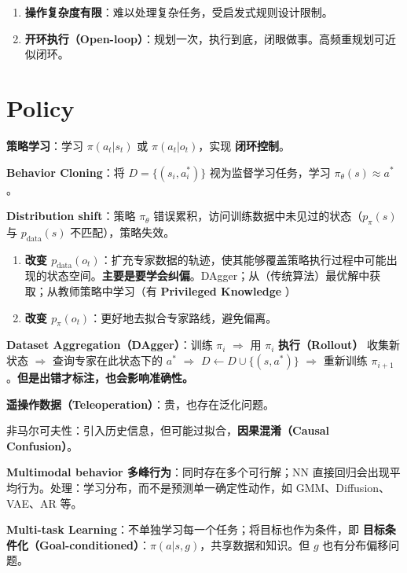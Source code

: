 \documentclass[
  8pt]{extarticle}
\providecommand{\tightlist}{%
  \setlength{\itemsep}{0pt}\setlength{\parskip}{0pt}}
\begin{document}
\begin{multicols*}{4}
\begin{enumerate}
\def\labelenumi{\arabic{enumi}.}
\tightlist
\item
  \textbf{操作复杂度有限}：难以处理复杂任务，受启发式规则设计限制。
\item
  \textbf{开环执行（Open-loop）}：规划一次，执行到底，闭眼做事。高频重规划可近似闭环。
\end{enumerate}

\hypertarget{policy}{%
\section{Policy}\label{policy}}

\textbf{策略学习}：学习 \(\pi(a_t|s_t)\) 或 \(\pi(a_t|o_t)\)，实现
\textbf{闭环控制}。

\textbf{Behavior Cloning}：将 \(D = \{(s_i, a_i^*)\}\)
视为监督学习任务，学习 \(\pi_\theta(s) \approx a^*\)。

\textbf{Distribution shift}：策略 \(\pi_\theta\)
错误累积，访问训练数据中未见过的状态（\(p_\pi(s)\) 与
\(p_{\text{data}}(s)\) 不匹配），策略失效。

\begin{enumerate}
\def\labelenumi{\arabic{enumi}.}
\tightlist
\item
  \textbf{改变
  \(p_{\text{data}}(o_t)\)}：扩充专家数据的轨迹，使其能够覆盖策略执行过程中可能出现的状态空间。\textbf{主要是要学会纠偏}。DAgger；从（传统算法）最优解中获取；从教师策略中学习（有
  \textbf{Privileged Knowledge} ）
\item
  \textbf{改变 \(p_{\pi}(o_t)\)}：更好地去拟合专家路线，避免偏离。
\end{enumerate}

\textbf{Dataset Aggregation（DAgger）}：训练 \(\pi_i\) \(\Rightarrow\)
用 \(\pi_i\) \textbf{执行（Rollout）} 收集新状态 \(\Rightarrow\)
查询专家在此状态下的 \(a^*\) \(\Rightarrow\)
\(D \leftarrow D \cup \{(s, a^*)\}\) \(\Rightarrow\) 重新训练
\(\pi_{i+1}\)。\textbf{但是出错才标注，也会影响准确性。}

\textbf{遥操作数据（Teleoperation）}：贵，也存在泛化问题。

非马尔可夫性：引入历史信息，但可能过拟合，\textbf{因果混淆（Causal
Confusion）}。

\textbf{Multimodal behavior 多峰行为}：同时存在多个可行解；NN
直接回归会出现平均行为。处理：学习分布，而不是预测单一确定性动作，如
GMM、Diffusion、VAE、AR 等。

\textbf{Multi-task Learning}：不单独学习每一个任务；将目标也作为条件，即
\textbf{目标条件化（Goal-conditioned）}：\(\pi(a|s, g)\)，共享数据和知识。但
\(g\) 也有分布偏移问题。


\end{multicols*}
\end{document}
